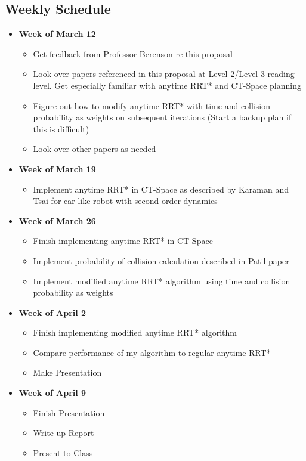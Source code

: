 \documentclass[12pt]{article}
\begin{document}
\subsection*{Weekly Schedule}
\begin{itemize}
\item \textbf{Week of March 12}
  \begin{itemize}
  \item Get feedback from Professor Berenson re this proposal
  \item Look over papers referenced in this proposal at Level 2/Level 3 reading level. Get especially familiar with anytime RRT* and CT-Space planning
  \item Figure out how to modify anytime RRT* with time and collision probability as weights on subsequent iterations (Start a backup plan if this is difficult)
  \item Look over other papers as needed
  \end{itemize}
  
\item \textbf{Week of March 19}
  \begin{itemize}
  \item Implement anytime RRT* in CT-Space as described by Karaman and Tsai for car-like robot with second order dynamics
  \end{itemize}
\item \textbf{Week of March 26}
  \begin{itemize}
  \item Finish implementing anytime RRT* in CT-Space
    \item Implement probability of collision calculation described in Patil paper
    \item Implement modified anytime RRT* algorithm using time and collision probability as weights
  \end{itemize}
\item \textbf{Week of April 2}

  \begin{itemize}
  \item Finish implementing modified anytime RRT* algorithm
    \item Compare performance of my algorithm to regular anytime RRT*
    \item Make Presentation
  \end{itemize}
\item \textbf{Week of April 9}

  \begin{itemize}
    \item Finish Presentation
    \item Write up Report
    \item Present to Class
  \end{itemize}
\end{itemize}
\end{document}
